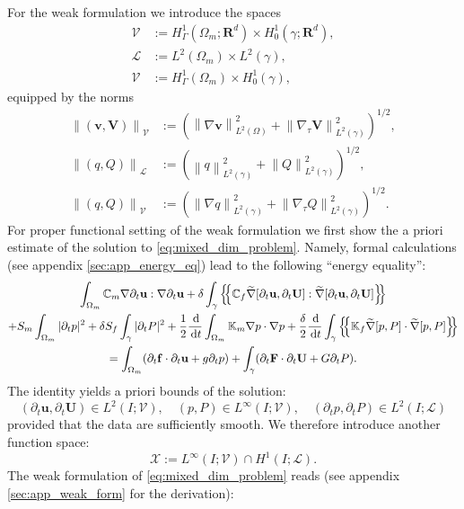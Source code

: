 \documentclass[a4paper]{article}
\numberwithin{equation}{section}
\def\agrad{\widetilde\nabla}
\def\avg#1{\left\{\mskip-5mu\left\{#1\right\}\mskip-5mu\right\}}
\def\CC{\tn C}
\def\d {\,{\rm d}}
\def\ddt#1{\frac{\d #1}{\d t}}
\def\dt{\prtl_t}
\def\FF{\vc F}
\def\ff{\vc f}
\def\Hf{\mathscr{L}} %
\def\norm#1{\left\|#1\right\|}
\def\prtl{\partial}
\def\Real{{\mathbf R}} %
\def\tn#1{{\mathbb{#1}}}    %
\def\U{\vc U}
\def\uu{\vc u}
\def\V{\vc V}
\def\Vel{{\boldsymbol{\mathcal V}}} %
\def\Vf{{\mathcal V}} %
\def\vc#1{\mathbf{#1}}     %
\def\vv{\vc v}
\newcommand{\eqs}[1]{\begin{equation*}#1\end{equation*}}
\newcommand{\ml}[1]{\begin{multline}#1\end{multline}}
\begin{document}
For the weak formulation we introduce the spaces
\begin{align*}
\Vel &:= H^1_\Gamma(\Omega_m;\Real^d)\times H^1_0(\gamma;\Real^d),\\
\Hf &:= L^2(\Omega_m)\times L^2(\gamma),\\
\Vf &:= H^1_\Gamma(\Omega_m)\times H^1_0(\gamma),
\end{align*}
equipped by the norms
\begin{align*}
\norm{(\vv,\V)}_\Vel &:= (\norm{\nabla\vv}_{L^2(\Omega)}^2 + \norm{\nabla_\tau\V}_{L^2(\gamma)}^2)^{1/2},\\
\norm{(q,Q)}_\Hf &:= (\norm{q}_{L^2(\gamma)}^2 + \norm{Q}_{L^2(\gamma)}^2)^{1/2},\\
\norm{(q,Q)}_\Vf &:= (\norm{\nabla q}_{L^2(\gamma)}^2 + \norm{\nabla_\tau Q}_{L^2(\gamma)}^2)^{1/2}.
\end{align*}
For proper functional setting of the weak formulation we first show the a priori estimate of the solution to \eqref{eq:mixed_dim_problem}.
Namely, formal calculations (see appendix \ref{sec:app_energy_eq}) lead to the following ``energy equality'':
\ml{ \label{eq:apriori_biot} \int_{\Omega_m}\CC_m\nabla\dt\uu:\nabla\dt\uu + \delta\int_\gamma\avg{\CC_f\agrad[\dt\uu,\dt\U]:\agrad[\dt\uu,\dt\U]}\\
+ S_m\int_{\Omega_m}|\dt p|^2 + \delta S_f\int_\gamma|\dt P|^2
+ \frac12\ddt{}\int_{\Omega_m}\tn K_m\nabla p\cdot\nabla p
+ \frac\delta2\ddt{}\int_\gamma\avg{\tn K_f\agrad[p,P]\cdot\agrad[p,P]}\\
= \int_{\Omega_m}(\dt\ff\cdot\dt\uu + g \dt p) + \int_\gamma(\dt\FF\cdot\dt\U + G \dt P). }
The identity yields a priori bounds of the solution:
\eqs{ (\dt\uu,\dt\U)\in L^2(I;\Vel),\quad (p,P)\in L^\infty(I;\Vf),\quad (\dt p,\dt P)\in L^2(I;\Hf) }
provided that the data are sufficiently smooth.
% 
We therefore introduce another function space:
\eqs{ \mathcal X := L^\infty( I;\Vf)\cap H^1( I;\Hf). }
The weak formulation of \eqref{eq:mixed_dim_problem} reads (see appendix \ref{sec:app_weak_form} for the derivation):
\end{document}

